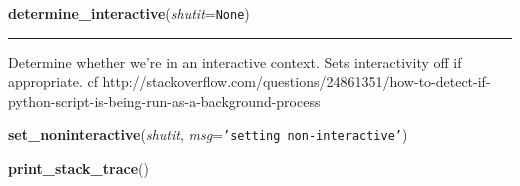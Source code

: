     \label{util:determine_interactive}

    \vspace{0.5ex}

\hspace{.8\funcindent}\begin{boxedminipage}{\funcwidth}

    \raggedright \textbf{determine\_interactive}(\textit{shutit}={\tt None})

    \vspace{-1.5ex}

    \rule{\textwidth}{0.5\fboxrule}
\setlength{\parskip}{2ex}
    Determine whether we're in an interactive context. Sets interactivity 
    off if appropriate. cf 
    http://stackoverflow.com/questions/24861351/how-to-detect-if-python-script-is-being-run-as-a-background-process

\setlength{\parskip}{1ex}
    \end{boxedminipage}

    \label{util:set_noninteractive}

    \vspace{0.5ex}

\hspace{.8\funcindent}\begin{boxedminipage}{\funcwidth}

    \raggedright \textbf{set\_noninteractive}(\textit{shutit}, \textit{msg}={\tt \texttt{'}\texttt{setting non-interactive}\texttt{'}})

\setlength{\parskip}{2ex}
\setlength{\parskip}{1ex}
    \end{boxedminipage}

    \label{util:print_stack_trace}

    \vspace{0.5ex}

\hspace{.8\funcindent}\begin{boxedminipage}{\funcwidth}

    \raggedright \textbf{print\_stack\_trace}()

\setlength{\parskip}{2ex}
\setlength{\parskip}{1ex}
    \end{boxedminipage}

    \label{util:ctrl_c_signal_handler}

